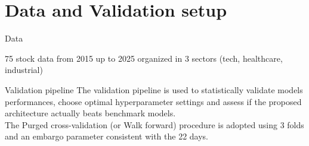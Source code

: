 \section{Data and Validation setup}

\begin{frame}{Data}
   
75 stock data from 2015 up to 2025 organized in 3 sectors (tech, healthcare, industrial)\\

   \vspace{5mm}
   
\begin{table}[H]
\centering
{}
\end{table}

\end{frame}




\begin{frame}{Validation pipeline}
    The validation pipeline is used to statistically validate models performances, choose optimal hyperparameter settings and 
    assess if the proposed architecture actually beats benchmark models.\\



    The Purged cross-validation (or Walk forward) procedure is adopted using 
    3 folds and an embargo parameter consistent with the 22 days.

    
\end{frame}



